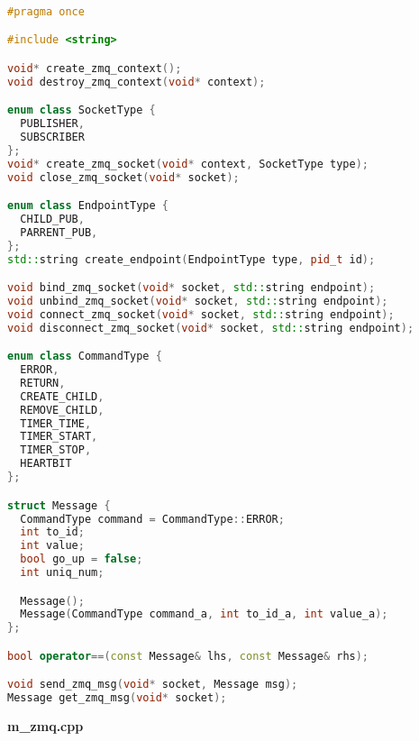\begin{lstlisting}[language=C++]

#pragma once

#include <string>

void* create_zmq_context();
void destroy_zmq_context(void* context);

enum class SocketType {
  PUBLISHER,
  SUBSCRIBER
};
void* create_zmq_socket(void* context, SocketType type);
void close_zmq_socket(void* socket);

enum class EndpointType {
  CHILD_PUB,
  PARRENT_PUB,
};
std::string create_endpoint(EndpointType type, pid_t id);

void bind_zmq_socket(void* socket, std::string endpoint);
void unbind_zmq_socket(void* socket, std::string endpoint);
void connect_zmq_socket(void* socket, std::string endpoint);
void disconnect_zmq_socket(void* socket, std::string endpoint);

enum class CommandType {
  ERROR,
  RETURN,
  CREATE_CHILD,
  REMOVE_CHILD,
  TIMER_TIME,
  TIMER_START,
  TIMER_STOP,
  HEARTBIT
};

struct Message {
  CommandType command = CommandType::ERROR;
  int to_id;
  int value;
  bool go_up = false;
  int uniq_num;

  Message();
  Message(CommandType command_a, int to_id_a, int value_a);
};

bool operator==(const Message& lhs, const Message& rhs);

void send_zmq_msg(void* socket, Message msg);
Message get_zmq_msg(void* socket);

\end{lstlisting}

\textbf{m\_zmq.cpp}

